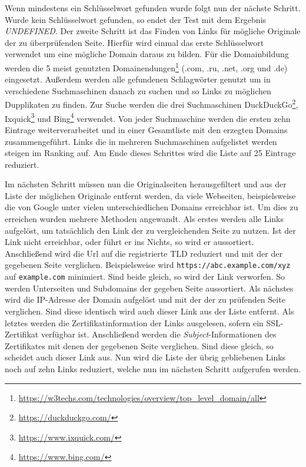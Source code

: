 Wenn mindestens ein Schlüsselwort gefunden wurde folgt nun der nächste Schritt. Wurde kein Schlüsselwort gefunden, so endet der Test mit dem Ergebnis \textit{UNDEFINED}. Der zweite Schritt ist das Finden von Links für mögliche Originale der zu überprüfenden Seite. Hierfür wird einmal das erste Schlüsselwort verwendet um eine mögliche Domain daraus zu bilden. Für die Domainbildung werden die 5 meist genutzten Domainendungen\footnote{\url{https://w3techs.com/technologies/overview/top_level_domain/all}} (.com, .ru, .net, .org und .de) eingesetzt. Außerdem werden alle gefundenen Schlagwörter genutzt um in verschiedene Suchmaschinen danach zu suchen und so Links zu möglichen Dupplikaten zu finden. Zur Suche werden die drei Suchmaschinen DuckDuckGo\footnote{\url{https://duckduckgo.com/}}, Ixquick\footnote{\url{https://www.ixquick.com/}} und Bing\footnote{\url{https://www.bing.com/}} verwendet. Von jeder Suchmaschine werden die ersten zehn Eintrage weiterverarbeitet und in einer Gesamtliste mit den erzegten Domains zusammengeführt. Links die in mehreren Suchmaschinen aufgelistet werden steigen im Ranking auf. Am Ende dieses Schrittes wird die Liste auf 25 Eintrage reduziert.

Im nächsten Schritt müssen nun die Originalseiten herausgefiltert und aus der Liste der möglichen Originale entfernt werden, da viele Webseiten, beispielsweise die von Google unter vielen unterschiedlichen Domains erreichbar ist. Um dies zu erreichen wurden mehrere Methoden angewandt. Als erstes werden alle Links aufgelöst, um tatsächlich den Link der zu vergleichenden Seite zu nutzen. Ist der Link nicht erreichbar, oder führt er ins Nichts, so wird er aussortiert. Anschließend wird die Url auf die registrierte \ac{TLD} reduziert und mit der der gegebenen Seite verglichen. Beispielsweise wird \lstinline[style=eclipse]{https://abc.example.com/xyz} auf \lstinline[style=eclipse]{example.com} minimiert. Sind beide gleich, so wird der Link verworfen. So werden Unterseiten und Subdomains der gegeben Seite aussortiert. Als nächstes wird die IP-Adresse der Domain aufgelöst und mit der der zu prüfenden Seite verglichen. Sind diese identisch wird auch dieser Link aus der Liste entfernt. Als letztes werden die Zertifikatinformation der Links ausgelesen, sofern ein SSL-Zertifikat verfügbar ist. Anschließend werden die \textit{Subject}-Informationen des Zertifikates mit denen der gegebenen Seite verglichen. Sind diese gleich, so scheidet auch dieser Link aus. Nun wird die Liste der übrig gebliebenen Links noch auf zehn Links reduziert, welche nun im nächsten Schritt aufgerufen werden.

